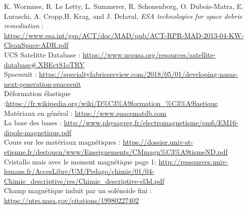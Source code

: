 \documentclass[a4paper,1pt]{article}
\begin{document}
\begin{thebibliography}{11}
	K. Wormnes, R. Le Letty, L. Summerer, R. Schonenborg, O. Dubois-Matra, E. Luraschi, A. Cropp,H. Krag, and J. Delaval, \textit{ESA technologies for space debris remediation} :\\
	\url{https://www.esa.int/gsp/ACT/doc/MAD/pub/ACT-RPR-MAD-2013-04-KW-CleanSpace-ADR.pdf}\\
	
	UCS Satelitte Database : \url{https://www.ucsusa.org/resources/satellite-database#.XBEctS1oTRY}\\

	Spacesuit : \url{https://specialtyfabricsreview.com/2018/05/01/developing-nasas-next-generation-spacesuit}\\
	
	Déformation élastique :\url{https://fr.wikipedia.org/wiki/D%C3%A9formation_%C3%A9lastique}\\

	Matériaux en général : \url{https://www.spacematdb.com}\\
	La base des bases  : \url{http://www.physagreg.fr/electromagnetisme/em6/EM16-dipole-magnetique.pdf}\\
	Cours sur les matériaux magnétiques : \url{https://dossier.univ-st-etienne.fr/destoucn/www/Enseignements/CMmagn%C3%A9tismeND.pdf}\\
	Cristallo mais avec le moment magnétique page 1: \url{http://ressources.univ-lemans.fr/AccesLibre/UM/Pedago/chimie/01/04-Chimie_descriptive/res/Chimie_descriptive-el3d.pdf}\\

	Champ magnétique induit par un solénoide fini : \url{https://ntrs.nasa.gov/citations/19980227402}
\end{thebibliography}
\end{document}
